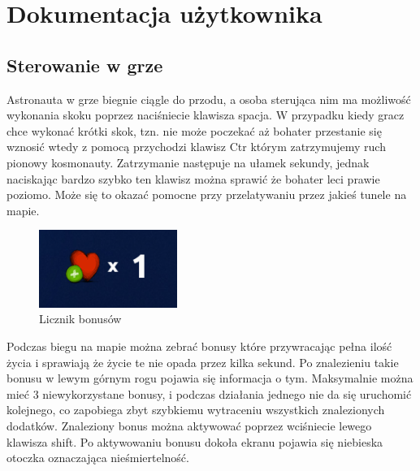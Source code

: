 \chapter{Dokumentacja użytkownika} 
\section{Sterowanie w grze}
Astronauta w grze biegnie ciągle do przodu, a osoba sterująca nim ma możliwość wykonania skoku poprzez naciśniecie klawisza spacja. W przypadku kiedy gracz chce wykonać krótki skok, tzn. nie może poczekać aż bohater przestanie się wznosić wtedy z pomocą przychodzi klawisz Ctr którym zatrzymujemy ruch pionowy kosmonauty. Zatrzymanie następuje na ułamek sekundy, jednak naciskając bardzo szybko ten klawisz można sprawić że bohater leci prawie poziomo. Może się to okazać pomocne przy przelatywaniu przez jakieś tunele na mapie. 


\begin{figure}
\begin{center}
\includegraphics[width=170px]{./Pictures/ilosczycia.png}
\end{center}
\caption{Licznik bonusów}
\label{Etykieta}
\end{figure}

Podczas biegu na mapie można zebrać bonusy które przywracając pełna ilość życia i sprawiają że życie te nie opada przez kilka sekund. Po znalezieniu takie bonusu w lewym górnym rogu pojawia się informacja o tym. Maksymalnie można mieć 3 niewykorzystane bonusy, i podczas działania jednego nie da się uruchomić kolejnego, co zapobiega zbyt szybkiemu wytraceniu wszystkich znalezionych dodatków. Znaleziony bonus można aktywować poprzez wciśniecie lewego klawisza shift. Po aktywowaniu bonusu dokoła ekranu pojawia się niebieska otoczka oznaczająca nieśmiertelność. 


